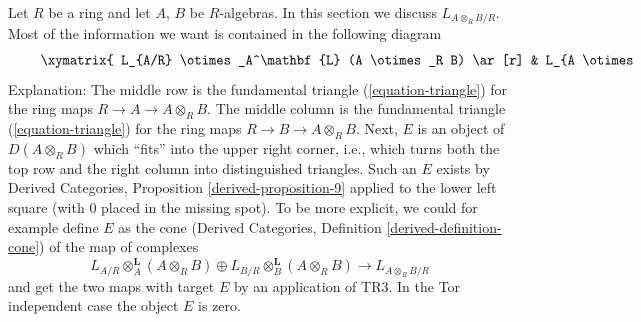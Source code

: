 \noindent
Let $R$ be a ring and let $A$, $B$ be $R$-algebras. In this section we
discuss $L_{A \otimes_R B/R}$. Most of the information we want is contained
in the following diagram
\begin{equation}
\label{equation-tensor-product}
\vcenter{
\xymatrix{
L_{A/R} \otimes_A^\mathbf{L} (A \otimes_R B) \ar[r] &
L_{A \otimes_R B/B} \ar[r] &
E \\
L_{A/R} \otimes_A^\mathbf{L} (A \otimes_R B) \ar[r] \ar@{=}[u] &
L_{A \otimes_R B/R} \ar[r] \ar[u] &
L_{A \otimes_R B/A} \ar[u] \\
 &
L_{B/R} \otimes_B^\mathbf{L} (A \otimes_R B) \ar[u] \ar@{=}[r] &
L_{B/R} \otimes_B^\mathbf{L} (A \otimes_R B) \ar[u]
}
}
\end{equation}
Explanation: The middle row is the fundamental triangle
(\ref{equation-triangle}) for the ring maps $R \to A \to A \otimes_R B$.
The middle column is the fundamental triangle
(\ref{equation-triangle}) for the ring maps $R \to B \to A \otimes_R B$.
Next, $E$ is an object of $D(A \otimes_R B)$ which ``fits'' into the
upper right corner, i.e., which turns both the top row
and the right column into distinguished triangles. Such an $E$
exists by Derived Categories, Proposition \ref{derived-proposition-9}
applied to the lower left square (with $0$ placed in the missing
spot). To be more explicit, we could for example define $E$ as the cone
(Derived Categories, Definition \ref{derived-definition-cone})
of the map of complexes
$$
L_{A/R} \otimes_A^\mathbf{L} (A \otimes_R B) \oplus
L_{B/R} \otimes_B^\mathbf{L} (A \otimes_R B)
\longrightarrow
L_{A \otimes_R B/R}
$$
and get the two maps with target $E$ by an application of TR3.
In the Tor independent case the object $E$ is zero.